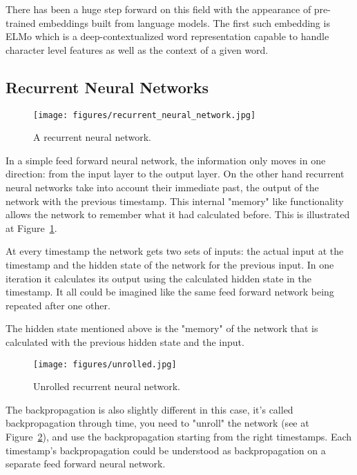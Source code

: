 There has been a huge step forward on this field with the appearance of pre-trained embeddings built from language models. The first such embedding is ELMo \cite{ELMo} which is a deep-contextualized word representation capable to handle character level features as well as the context of a given word.


\subsection{Recurrent Neural Networks}

\begin{figure}[!ht]
	\centering
	\texttt{[image: figures/recurrent\_neural\_network.jpg]}
	\caption{A recurrent neural network.}
	\label{fig:recurrent_net}
\end{figure}

In a simple feed forward neural network, the information only moves in one direction: from the input layer to the output layer. On the other hand recurrent neural networks take into account their immediate past, the output of the network with the previous timestamp. This internal "memory" like functionality allows the network to remember what it had calculated before. This is illustrated at Figure~\ref{fig:recurrent_net}.

At every timestamp the network gets two sets of inputs: the actual input at the timestamp and the hidden state of the network for the previous input. In one iteration it calculates its output using the calculated hidden state in the timestamp. It all could be imagined like the same feed forward network being repeated after one other.

The hidden state mentioned above is the "memory" of the network that is calculated with the previous hidden state and the input.

\begin{figure}[!ht]
	\centering
	\texttt{[image: figures/unrolled.jpg]}
	\caption{Unrolled recurrent neural network.}
	\label{fig:unrolled}
\end{figure}

The backpropagation is also slightly different in this case, it's called backpropagation through time, you need to "unroll" the network (see at Figure~\ref{fig:unrolled}), and use the backpropagation starting from the right timestamps. Each timestamp's backpropagation could be understood as backpropagation on a separate feed forward neural network.

